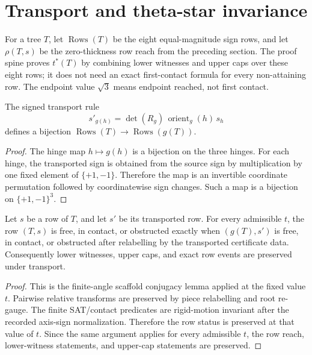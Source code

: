 
\section{Transport and theta-star invariance}

For a tree \(T\), let \(\operatorname{Rows}(T)\) be the eight equal-magnitude sign rows, and let \(\rho(T,s)\) be the zero-thickness row reach from the preceding section.  The proof spine proves \(t^*(T)\) by combining lower witnesses and upper caps over these eight rows; it does not need an exact first-contact formula for every non-attaining row.  The endpoint value \(\sqrt{3}\) means endpoint reached, not first contact.

\begin{lemma}
The signed transport rule
\[
  s'_{g(h)} = \det(R_g)\, \operatorname{orient}_g(h)\, s_h
\]
defines a bijection \(\operatorname{Rows}(T)\to\operatorname{Rows}(g(T))\).
\end{lemma}

\begin{proof}
The hinge map \(h \mapsto g(h)\) is a bijection on the three hinges.  For each hinge, the transported sign is obtained from the source sign by multiplication by one fixed element of \(\{+1,-1\}\).  Therefore the map is an invertible coordinate permutation followed by coordinatewise sign changes.  Such a map is a bijection on \(\{+1,-1\}^3\).
\end{proof}

\begin{lemma}
Let \(s\) be a row of \(T\), and let \(s'\) be its transported row.  For every admissible \(t\), the row \((T,s)\) is free, in contact, or obstructed exactly when \((g(T),s')\) is free, in contact, or obstructed after relabelling by the transported certificate data.  Consequently lower witnesses, upper caps, and exact row events are preserved under transport.
\end{lemma}

\begin{proof}
This is the finite-angle scaffold conjugacy lemma applied at the fixed value \(t\).  Pairwise relative transforms are preserved by piece relabelling and root re-gauge.  The finite SAT/contact predicates are rigid-motion invariant after the recorded axis-sign normalization.  Therefore the row status is preserved at that value of \(t\).  Since the same argument applies for every admissible \(t\), the row reach, lower-witness statements, and upper-cap statements are preserved.
\end{proof}


